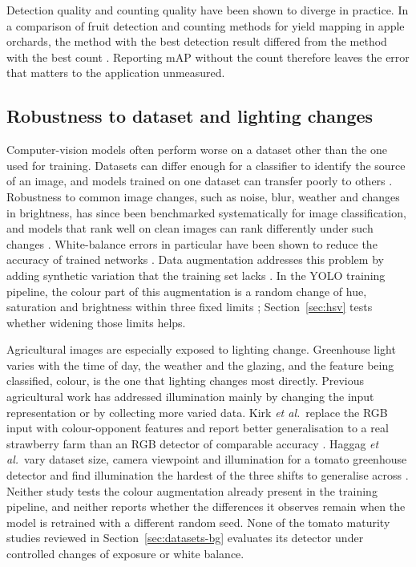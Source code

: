 Detection quality and counting quality have been shown to diverge in practice.
In a comparison of fruit detection and counting methods for yield mapping in
apple orchards, the method with the best detection result differed from the
method with the best count \cite{hani2020comparative}. Reporting mAP without
the count therefore leaves the error that matters to the application
unmeasured.

\subsection{Robustness to dataset and lighting changes}

Computer-vision models often perform worse on a dataset other than the one used
for training. Datasets can differ enough for a classifier to identify the source
of an image, and models trained on one dataset can transfer poorly to others
\cite{torralba2011unbiased}. Robustness to common
image changes, such as noise, blur, weather and changes in brightness, has
since been benchmarked systematically for image classification, and models
that rank well on clean images can rank differently under such changes
\cite{hendrycks2019benchmarking}. White-balance errors in particular have been
shown to reduce the accuracy of trained networks \cite{afifi2019whatelse}.
Data augmentation addresses this problem by adding synthetic variation that the
training set lacks \cite{shorten2019augmentation}. In the YOLO training
pipeline, the colour part of this augmentation is a random change of hue,
saturation and brightness within three fixed limits \cite{bochkovskiy2020yolov4,
ultralytics2026cfg}; Section~\ref{sec:hsv} tests whether widening those limits helps.

Agricultural images are especially exposed to lighting change. Greenhouse light
varies with the time of day, the weather and the glazing, and the feature being
classified, colour, is the one that lighting changes most directly. Previous
agricultural work has addressed illumination mainly by changing the input
representation or by collecting more varied data. Kirk \emph{et al.}\ replace
the RGB input with colour-opponent features and report better generalisation to
a real strawberry farm than an RGB detector of comparable accuracy
\cite{kirk2020lab}. Haggag \emph{et al.}\ vary dataset size, camera viewpoint
and illumination for a tomato greenhouse detector and find illumination the
hardest of the three shifts to generalise across
\cite{haggag2024generalization}. Neither study tests the colour augmentation
already present in the training pipeline, and neither reports whether the
differences it observes remain when the model is retrained with a different
random seed. None of the tomato maturity studies reviewed in
Section~\ref{sec:datasets-bg} evaluates its detector under controlled changes
of exposure or white balance.

